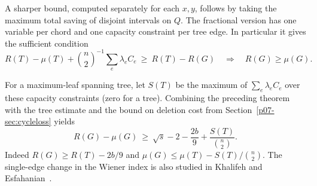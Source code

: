 \documentclass[11pt,a4paper]{article}
\begin{document}
A sharper bound, computed separately for each $x,y$, follows by taking
the maximum total saving of disjoint intervals on $Q$. The fractional
version has one variable per chord and one capacity constraint per tree
edge. In particular it gives the sufficient condition
\[
 R(T)-\mu(T)+\binom n2^{-1}\sum_e\lambda_e C_e
  \ \ge\ R(T)-R(G)
 \quad\Longrightarrow\quad R(G)\ge\mu(G).
\]

For a maximum-leaf spanning tree, let $S(T)$ be the maximum of
$\sum_e\lambda_e C_e$ over these capacity constraints (zero for a tree).
Combining the preceding theorem with the tree estimate and the bound
on deletion cost from Section~\ref{p07-sec:cycleloss} yields
\begin{equation}\label{p07-eq:combined}
 \boxed{\quad R(G)-\mu(G)\ \ge\ \sqrt{s}-2-\frac{2b}{9}
                           +\frac{S(T)}{\binom n2}.\quad}
\end{equation}
Indeed $R(G)\ge R(T)-2b/9$ and $\mu(G)\le\mu(T)-S(T)/\binom n2$.
The single-edge change in the Wiener index is also studied in
Khalifeh and Esfahanian~\cite{p07-KE}.
\end{document}
